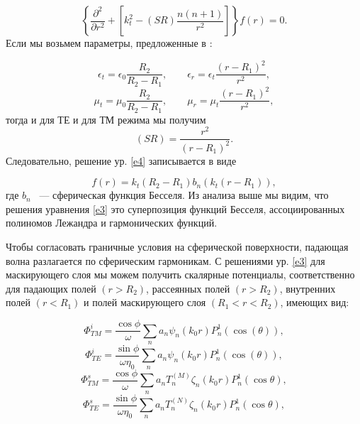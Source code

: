 \documentclass[a4paper, 12pt]{article}
\begin{document}
\begin{equation}\label{e4}
	\left\{\frac{\partial^2}{\partial r^2} + 
\left[k^2_t-(SR)\frac{n(n+1)}{r^2}\right]
	\right\}f(r) = 0.
\end{equation}
Если мы возьмем параметры, предложенные в \cite{4}:

\begin{equation*}
	\epsilon_t = \epsilon_0 \frac{R_2}{R_2-R_1}, \qquad
	\epsilon_r=\epsilon_t \frac{(r-R_1)^2}{r^2}, 
\end{equation*}
\begin{equation*}
 	\mu_t = \mu_0 \frac{R_2}{R_2-R_1}, \qquad
	\mu_r = \mu_t \frac{(r-R_1)^2}{r^2},	
 \end{equation*} 
тогда и для ТЕ и для ТМ режима мы получим
\begin{equation*}
(SR)=\frac{r^2}{(r-R_1)^2}.	
\end{equation*}
Следовательно, решение ур. \eqref{e4} записывается в виде

\begin{equation}\label{e5}
	f(r) = k_t(R_2-R_1)b_n(k_t(r-R_1)),	
\end{equation}
где $b_n$ ~--- сферическая функция Бесселя. Из анализа выше мы видим, что решения
уравнения \eqref{e3} это суперпозиция функций Бесселя, ассоциированных полиномов 
Лежандра и гармонических функций.

Чтобы согласовать граничные условия на сферической поверхности, падающая волна
разлагается по сферическим гармоникам. С решениями ур. \eqref{e3} 
для маскирующего слоя мы можем получить скалярные потенциалы, соответственно
для падающих полей $(r>R_2)$, рассеянных полей $(r>R_2)$, внутренних полей
$(r<R_1)$ и полей маскирующего слоя $(R_1<r<R_2)$, имеющих вид:

\begin{equation*}
\Phi_{TM}^i = \frac{\cos\phi}{\omega}\sum_n{a_n\psi_n(k_0r)P_n^1(\cos(\theta))},
\end{equation*}
\begin{equation}\label{e6}
\Phi_{TE}^i = \frac{\sin\phi}{\omega\eta_0}\sum_n{a_n\psi_n(k_0r)P_n^1(\cos(\theta))},
\end{equation}
\vspace{1cm}
\begin{equation*}
	\Phi_{TM}^s = \frac{\cos\phi}{\omega}\sum_n{a_nT_n^{(M)}\zeta_n(k_0r)P_n^1(\cos\theta)},
\end{equation*}
\begin{equation}\label{e7}
	\Phi_{TE}^s = \frac{\sin\phi}{\omega\eta_0}\sum_n{a_nT_n^{(N)}\zeta_n(k_0r)P_n^1(\cos\theta)},
\end{equation}
\end{document}
